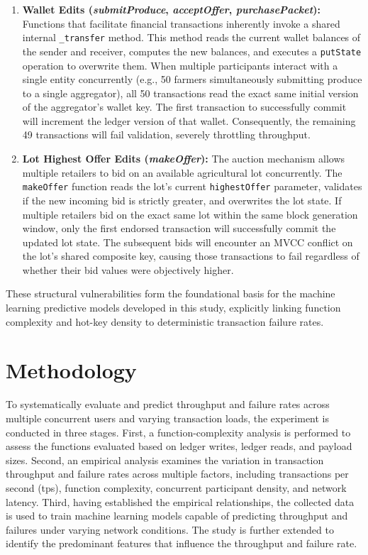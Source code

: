 \documentclass[12pt]{article}
\begin{document}
\begin{enumerate}
    \item \textbf{Wallet Edits (\textit{submitProduce}, \textit{acceptOffer}, \textit{purchasePacket}):} Functions that facilitate financial transactions inherently invoke a shared internal \texttt{\_transfer} method. This method reads the current wallet balances of the sender and receiver, computes the new balances, and executes a \texttt{putState} operation to overwrite them. When multiple participants interact with a single entity concurrently (e.g., 50 farmers simultaneously submitting produce to a single aggregator), all 50 transactions read the exact same initial version of the aggregator's wallet key. The first transaction to successfully commit will increment the ledger version of that wallet. Consequently, the remaining 49 transactions will fail validation, severely throttling throughput.
    
    \item \textbf{Lot Highest Offer Edits (\textit{makeOffer}):} The auction mechanism allows multiple retailers to bid on an available agricultural lot concurrently. The \texttt{makeOffer} function reads the lot's current \texttt{highestOffer} parameter, validates if the new incoming bid is strictly greater, and overwrites the lot state. If multiple retailers bid on the exact same lot within the same block generation window, only the first endorsed transaction will successfully commit the updated lot state. The subsequent bids will encounter an MVCC conflict on the lot's shared composite key, causing those transactions to fail regardless of whether their bid values were objectively higher.
\end{enumerate}

These structural vulnerabilities form the foundational basis for the machine learning predictive models developed in this study, explicitly linking function complexity and hot-key density to deterministic transaction failure rates.


\section{Methodology}

To systematically evaluate and predict throughput and failure rates across multiple concurrent users and varying transaction loads, the experiment is conducted in three stages. First, a function-complexity analysis is performed to assess the functions evaluated based on ledger writes, ledger reads, and payload sizes. Second, an empirical analysis examines the variation in transaction throughput and failure rates across multiple factors, including transactions per second (tps), function complexity, concurrent participant density, and network latency. Third, having established the empirical relationships, the collected data is used to train machine learning models capable of predicting throughput and failures under varying network conditions. The study is further extended to identify the predominant features that influence the throughput and failure rate. 
\end{document}
